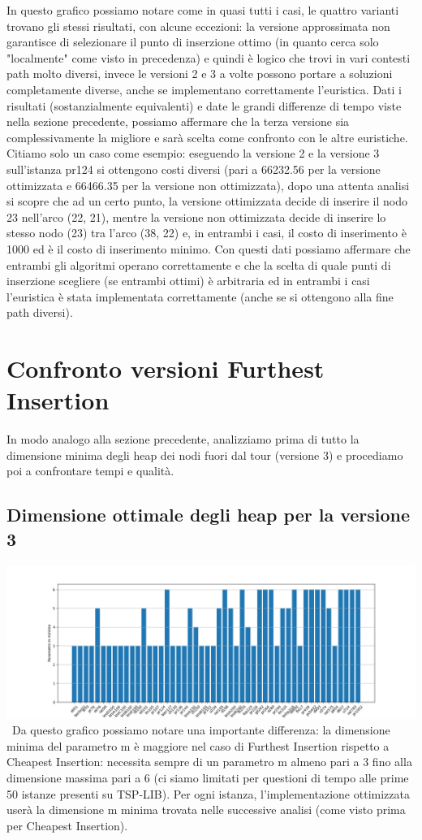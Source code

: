 \documentclass[a4paper,12pt]{report}
\begin{document}
In questo grafico possiamo notare come in quasi tutti i casi, le quattro varianti trovano gli stessi risultati, con alcune eccezioni: la versione approssimata non garantisce di selezionare il punto di inserzione ottimo (in quanto cerca solo "localmente" come visto in precedenza) e quindi è logico che trovi in vari contesti path molto diversi, invece le versioni 2 e 3 a volte possono portare a soluzioni completamente diverse, anche se implementano correttamente l'euristica. Dati i risultati (sostanzialmente equivalenti) e date le grandi differenze di tempo viste nella sezione precedente, possiamo affermare che la terza versione sia complessivamente la migliore e sarà scelta come confronto con le altre euristiche. Citiamo solo un caso come esempio: eseguendo la versione 2 e la versione 3 sull'istanza pr124 si ottengono costi diversi (pari a 66232.56 per la versione ottimizzata e 66466.35 per la versione non ottimizzata), dopo una attenta analisi si scopre che ad un certo punto, la versione ottimizzata decide di inserire il nodo 23 nell'arco (22, 21), mentre la versione non ottimizzata decide di inserire lo stesso nodo (23) tra l'arco (38, 22) e, in entrambi i casi, il costo di inserimento è 1000 ed è il costo di inserimento minimo. Con questi dati possiamo affermare che entrambi gli algoritmi operano correttamente e che la scelta di quale punti di inserzione scegliere (se entrambi ottimi) è arbitraria ed in entrambi i casi l'euristica è stata implementata correttamente (anche se si ottengono alla fine path diversi).

\section{Confronto versioni Furthest Insertion}
In modo analogo alla sezione precedente, analizziamo prima di tutto la dimensione minima degli heap dei nodi fuori dal tour (versione 3) e procediamo poi a confrontare tempi e qualità.
\subsection{Dimensione ottimale degli heap per la versione 3 }
\includegraphics[width=1\textwidth]{../Grafici/4.png} \
Da questo grafico possiamo notare una importante differenza: la dimensione minima del parametro m è maggiore nel caso di Furthest Insertion rispetto a Cheapest Insertion: necessita sempre di un parametro m almeno pari a 3 fino alla dimensione massima pari a 6 (ci siamo limitati per questioni di tempo alle prime 50 istanze presenti su TSP-LIB). Per ogni istanza, l'implementazione ottimizzata userà la dimensione m minima trovata nelle successive analisi (come visto prima per Cheapest Insertion).
\end{document}
